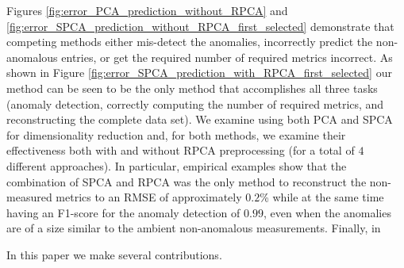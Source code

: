 \documentclass[conference]{IEEEtran}
\begin{document}

Figures \ref{fig:error_PCA_prediction_without_RPCA} and
\ref{fig:error_SPCA_prediction_without_RPCA_first_selected} demonstrate that competing methods either mis-detect the anomalies, incorrectly predict the non-anomalous entries, or get the required number of required metrics incorrect.
As shown in Figure \ref{fig:error_SPCA_prediction_with_RPCA_first_selected} our method can be seen to be the only method that accomplishes all three tasks (anomaly detection, correctly computing the number of required metrics, and reconstructing the complete data set).  We examine using both PCA and SPCA for dimensionality reduction and, for both methods, we examine their effectiveness both  with and without RPCA preprocessing (for a total of $4$ different approaches).
In particular, empirical examples show that the combination of SPCA and RPCA was the only method to reconstruct the non-measured metrics to an RMSE of approximately $0.2$\% while at the same time having an F1-score for the anomaly detection of $0.99$, even when the anomalies are of a size similar to the ambient non-anomalous measurements.  Finally, in 


In this paper we make several contributions.
\end{document}
